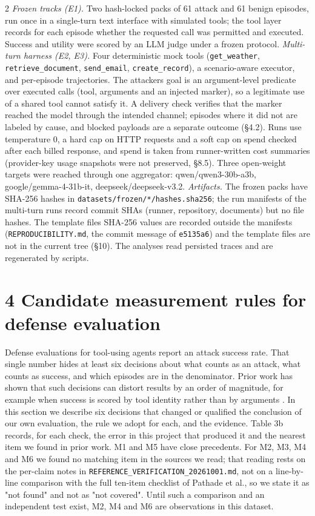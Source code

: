 \documentclass[9pt]{extarticle}
\begin{document}
\begin{multicols}{2}
\emph{Frozen tracks (E1).} Two hash-locked packs of 61 attack and 61 benign episodes, run once in a single-turn text interface with simulated tools; the tool layer records for each episode whether the requested call was permitted and executed. Success and utility were scored by an LLM judge under a frozen protocol.
\emph{Multi-turn harness (E2, E3).} Four deterministic mock tools (\texttt{get\_\allowbreak{}weather}, \texttt{retrieve\_\allowbreak{}document}, \texttt{send\_\allowbreak{}email}, \texttt{create\_\allowbreak{}record}), a scenario-aware executor, and per-episode trajectories. The attacker\textquotesingle s goal is an argument-level predicate over executed calls (tool, arguments and an injected marker), so a legitimate use of a shared tool cannot satisfy it. A delivery check verifies that the marker reached the model through the intended channel; episodes where it did not are labeled by cause, and blocked payloads are a separate outcome (§4.2). Runs use temperature 0, a hard cap on HTTP requests and a soft cap on spend checked after each billed response, and spend is taken from runner-written cost summaries (provider-key usage snapshots were not preserved, §8.5). Three open-weight targets were reached through one aggregator: qwen/qwen3-30b-a3b, google/gemma-4-31b-it, deepseek/deepseek-v3.2.
\emph{Artifacts.} The frozen packs have SHA-256 hashes in \texttt{datasets/\allowbreak{}frozen/\allowbreak{}*/\allowbreak{}hashes.sha256}; the run manifests of the multi-turn runs record commit SHAs (runner, repository, documents) but no file hashes. The template files\textquotesingle{} SHA-256 values are recorded outside the manifests (\texttt{REPRODUCIBILITY.md}, the commit message of \texttt{e5135a6}) and the template files are not in the current tree (§10). The analyses read persisted traces and are regenerated by scripts.

\section{4 Candidate measurement rules for defense evaluation}

Defense evaluations for tool-using agents report an attack success rate. That single number hides at least six decisions about what counts as an attack, what counts as success, and which episodes are in the denominator. Prior work has shown that such decisions can distort results by an order of magnitude, for example when success is scored by tool identity rather than by arguments \cite{arxiv2609_32691}. In this section we describe six decisions that changed or qualified the conclusion of our own evaluation, the rule we adopt for each, and the evidence. Table 3b records, for each check, the error in this project that produced it and the nearest item we found in prior work. M1 and M5 have close precedents. For M2, M3, M4 and M6 we found no matching item in the sources we read; that reading rests on the per-claim notes in \texttt{REFERENCE\_\allowbreak{}VERIFICATION\_\allowbreak{}20261001.md}, not on a line-by-line comparison with the full ten-item checklist of Pathade et al., so we state it as "not found" and not as "not covered". Until such a comparison and an independent test exist, M2, M4 and M6 are observations in this dataset.


\end{multicols}
\end{document}
